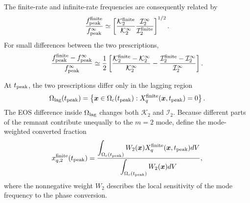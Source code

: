\documentclass[11pt]{article}
\begin{document}
The finite-rate and infinite-rate frequencies are consequently related by
\begin{equation}
\frac{f_{\rm peak}^{\rm finite}}
{f_{\rm peak}^{\infty}}
\simeq
\left[
\frac{\mathcal K_2^{\rm finite}}
{\mathcal K_2^{\infty}}
\frac{\mathcal I_2^{\infty}}
{\mathcal I_2^{\rm finite}}
\right]^{1/2}.
\label{eq:generic-mode-frequency-ratio}
\end{equation}
For small differences between the two prescriptions,
\begin{equation}
\frac{
f_{\rm peak}^{\rm finite}
-
f_{\rm peak}^{\infty}
}{
f_{\rm peak}^{\infty}
}
\simeq
\frac{1}{2}
\left[
\frac{
\mathcal K_2^{\rm finite}
-
\mathcal K_2^{\infty}
}{
\mathcal K_2^{\infty}
}
-
\frac{
\mathcal I_2^{\rm finite}
-
\mathcal I_2^{\infty}
}{
\mathcal I_2^{\infty}
}
\right].
\label{eq:linear-mode-frequency-shift}
\end{equation}

At \(t_{\rm peak}\), the two prescriptions differ only in the lagging region
\begin{equation}
\Omega_{\rm lag}(t_{\rm peak})
=
\left\{
\boldsymbol{x}\in\Omega_c(t_{\rm peak}):
X_q^{\rm finite}(\boldsymbol{x},t_{\rm peak})=0
\right\}.
\label{eq:lagging-region}
\end{equation}
The EOS difference inside \(\Omega_{\rm lag}\) changes both \(\mathcal K_2\) and \(\mathcal I_2\).
Because different parts of the remnant contribute unequally to the \(m=2\) mode, define the mode-weighted converted fraction
\begin{equation}
x_{q,2}^{\rm finite}(t_{\rm peak})
=
\frac{
\displaystyle
\int_{\Omega_c(t_{\rm peak})}
W_2(\boldsymbol{x})
X_q^{\rm finite}(\boldsymbol{x},t_{\rm peak})
dV
}{
\displaystyle
\int_{\Omega_c(t_{\rm peak})}
W_2(\boldsymbol{x})
dV
},
\label{eq:mode-weighted-converted-fraction}
\end{equation}
where the nonnegative weight \(W_2\) describes the local sensitivity of the mode frequency to the phase conversion.
\end{document}
